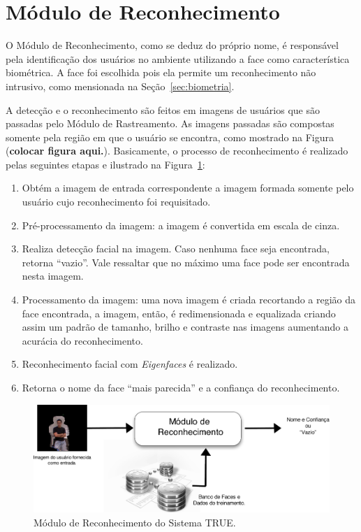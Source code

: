 \section{Módulo de Reconhecimento}

	O Módulo de Reconhecimento, como se deduz do próprio nome, é responsável pela
	identificação dos usuários no ambiente utilizando a face como característica
	biométrica. A face foi escolhida pois ela permite um reconhecimento não
	intrusivo, como mensionada na Seção~\ref{sec:biometria}.

	A detecção e o reconhecimento são feitos em imagens de usuários que são
	passadas pelo Módulo de Rastreamento. As imagens passadas são compostas somente
	pela região em que o usuário se encontra, como mostrado na Figura
	(\textbf{colocar figura aqui.}). Basicamente, o processo de reconhecimento é
	realizado pelas seguintes etapas e ilustrado na
	Figura~\ref{fig:processo-reconhecimento}:

		\begin{enumerate}
			\item Obtém a imagem de entrada correspondente a imagem formada somente pelo usuário cujo reconhecimento foi requisitado.
			\item Pré-processamento da imagem: a imagem é convertida em escala de cinza.
			\item Realiza detecção facial na imagem. Caso nenhuma face seja encontrada, retorna ``vazio''. Vale ressaltar que no máximo uma face pode ser encontrada nesta imagem.
			\item Processamento da imagem: uma nova imagem é criada recortando a região da face encontrada, a imagem, então, é redimensionada e equalizada criando assim um padrão de tamanho, brilho e contraste nas imagens aumentando a acurácia do reconhecimento.
			\item Reconhecimento facial com \textit{Eigenfaces} é realizado.
			\item Retorna o nome da face ``mais parecida'' e a confiança do reconhecimento.
		\end{enumerate}

		\begin{figure}[hbt]
			\begin{center}
				\includegraphics[scale=2.0]{figuras/4.ProblemaEProposta/reconhecimento-simples.png}
			\end{center}
			\caption{Módulo de Reconhecimento do Sistema TRUE.}
			\label{fig:processo-reconhecimento}
		\end{figure}

